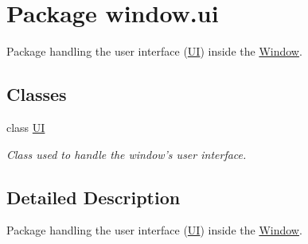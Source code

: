 \hypertarget{a00088}{\section{Package window.\-ui}
\label{a00088}
}


Package handling the user interface (\hyperlink{a00034}{U\-I}) inside the \hyperlink{a00037}{Window}.  


\subsection*{Classes}
\begin{DoxyCompactItemize}
\item 
class \hyperlink{a00034}{U\-I}
\begin{DoxyCompactList}\small\item\em Class used to handle the window's user interface. \end{DoxyCompactList}\end{DoxyCompactItemize}


\subsection{Detailed Description}
Package handling the user interface (\hyperlink{a00034}{U\-I}) inside the \hyperlink{a00037}{Window}. 